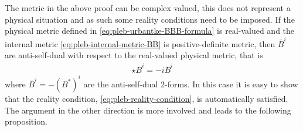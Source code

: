 \documentclass[10pt]{report}
\theoremstyle{definition}
\begin{document}
The metric in the above proof can be complex valued, this does not represent a physical situation and as such some reality conditions need to be imposed. If the physical metric defined in \cref{eq:pleb-urbantke-BBB-formula} is real-valued and the internal metric \cref{eq:pleb-internal-metric-BB} is positive-definite metric, then $\bar{B}^i$ are anti-self-dual with respect to the real-valued physical metric, that is
\begin{align}
    \star \overline{B}^i = -i \overline{B}^i
\end{align}
where $\bar{B}^i = -(B^*)^i$ are the anti-self-dual 2-forms. In this case it is easy to show that the reality condition, \cref{eq:pleb-reality-condition}, is automatically satisfied. The argument in the other direction is more involved and leads to the following proposition.
\end{document}
